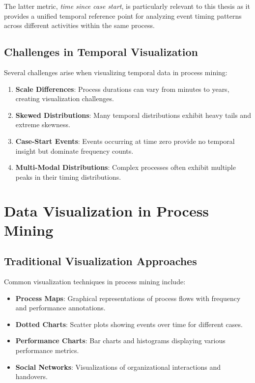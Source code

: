 The latter metric, \textit{time since case start}, is particularly relevant to this thesis as it provides a unified temporal reference point for analyzing event timing patterns across different activities within the same process.

\subsection{Challenges in Temporal Visualization}
\label{subsec:temporal_challenges}

Several challenges arise when visualizing temporal data in process mining:

\begin{enumerate}
    \item \textbf{Scale Differences}: Process durations can vary from minutes to years, creating visualization challenges.
    
    \item \textbf{Skewed Distributions}: Many temporal distributions exhibit heavy tails and extreme skewness.
    
    \item \textbf{Case-Start Events}: Events occurring at time zero provide no temporal insight but dominate frequency counts.
    
    \item \textbf{Multi-Modal Distributions}: Complex processes often exhibit multiple peaks in their timing distributions.
\end{enumerate}

\section{Data Visualization in Process Mining}
\label{sec:visualization_pm}

\subsection{Traditional Visualization Approaches}
\label{subsec:traditional_viz}

Common visualization techniques in process mining include:

\begin{itemize}
    \item \textbf{Process Maps}: Graphical representations of process flows with frequency and performance annotations.
    \item \textbf{Dotted Charts}: Scatter plots showing events over time for different cases.
    \item \textbf{Performance Charts}: Bar charts and histograms displaying various performance metrics.
    \item \textbf{Social Networks}: Visualizations of organizational interactions and handovers.
\end{itemize}

